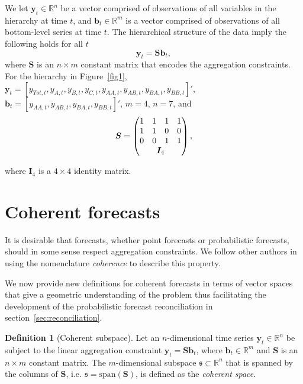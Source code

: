 \documentclass[a4paper, 11pt]{article}
\theoremstyle{theo}
\theoremstyle{definition}
\newtheorem{definition}{Definition}[section]
\begin{document}
We let $\bm{y}_t \in \mathbb{R}^n$ be a vector comprised of observations of all variables in the hierarchy at time $t$,  and $\bm{b}_t \in \mathbb{R}^m$ is a vector comprised of observations of all bottom-level series at time $t$. The hierarchical structure of the data imply the following holds for all $t$
\begin{equation}
  \bm{y}_t = \bm{Sb}_t,
\end{equation}
where $\bm{S}$ is an $n \times m$ constant matrix that encodes the aggregation constraints.  For the hierarchy in Figure~\ref{fig1}, $\bm{y}_t = [y_{Tot,t},y_{A,t}, y_{B,t},y_{C,t},y_{AA,t}, y_{AB,t}, y_{BA,t}, y_{BB,t}]'$, $\bm{b}_t = [y_{AA,t}, y_{AB,t}, y_{BA,t}, y_{BB,t}]'$, $m=4$, $n=7$, and 
$$ 
  \bm{S} = \begin{pmatrix} 
               1& 1 &1 &1  \\ 
               1 &1 & 0 &0 \\   
               0&0  & 1 & 1 \\ 
               & \multicolumn{2}{c}{\bm{I}_4} &   
           \end{pmatrix}, 
$$ 

where $\bm{I}_4$ is a $4\times 4$ identity matrix.  

\section{Coherent forecasts}\label{sec:definitions}

It is desirable that forecasts, whether point forecasts or probabilistic forecasts, should in some sense respect aggregation constraints.  We follow other authors in using the nomenclature {\em coherence} to describe this property.   

We now provide new definitions for coherent forecasts in terms of vector spaces that give a geometric understanding of the problem thus facilitating the development of the probabilistic forecast reconciliation in section~\ref{sec:reconciliation}. 

\begin{definition}[Coherent subspace]\label{def:cohspace}
Let an $n$-dimensional time series $\bm{y}_t \in \mathbb{R}^n$ be subject to the linear aggregation constraint $\bm{y}_t = \bm{S}\bm{b}_t$, where $\bm{b}_t \in \mathbb{R}^m$ and $\bm{S}$ is an $n \times m$ constant matrix. The $m$-dimensional subspace $\mathfrak{s}\subset \mathbb{R}^n$ that is spanned by the columns of $\bm{S}$, i.e. $\mathfrak{s}=\mbox{span}(\bm{S})$, is defined as the {\em coherent space}. 
\end{definition}
\end{document}
